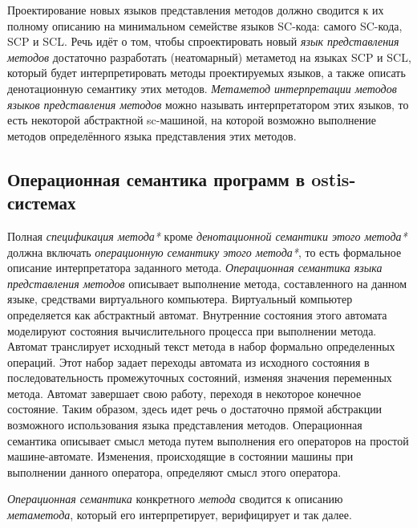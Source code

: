 \begin{textitemize}
    \item Проектирование новых языков представления методов должно сводится к их полному описанию на минимальном семействе языков SC-кода: самого SC-кода, SCP и SCL. Речь идёт о том, чтобы спроектировать новый \textit{язык представления методов} достаточно разработать (неатомарный) метаметод на языках SCP и SCL, который будет интерпретировать методы проектируемых языков, а также описать денотационную семантику этих методов. \textit{Метаметод интерпретации методов языков представления методов} можно называть интерпретатором этих языков, то есть некоторой абстрактной sc-машиной, на которой возможно выполнение методов определённого языка представления этих методов.
\end{textitemize}

\subsection{Операционная семантика программ в ostis-системах}
\label{sec_programs_method_op_semantic}

Полная \textit{спецификация метода*} кроме \textit{денотационной семантики этого метода*} должна включать \textit{операционную семантику этого метода*}, то есть формальное описание интерпретатора заданного метода. \textit{Операционная семантика языка представления методов} описывает выполнение метода, составленного на данном языке, средствами виртуального компьютера. Виртуальный компьютер определяется как абстрактный автомат. Внутренние состояния этого автомата моделируют состояния вычислительного процесса при выполнении метода. Автомат транслирует исходный текст метода в набор формально определенных операций. Этот набор задает переходы автомата из исходного состояния в последовательность промежуточных состояний, изменяя значения переменных метода. Автомат завершает свою работу, переходя в некоторое конечное состояние. Таким образом, здесь идет речь о достаточно прямой абстракции возможного использования языка представления методов. Операционная семантика описывает смысл метода путем выполнения его операторов на простой машине-автомате. Изменения, происходящие в состоянии машины при выполнении данного оператора, определяют смысл этого оператора.

\textit{Операционная семантика} конкретного \textit{метода} сводится к описанию \textit{метаметода}, который его интерпретирует, верифицирует и так далее.

\begin{SCn}
\end{SCn}

